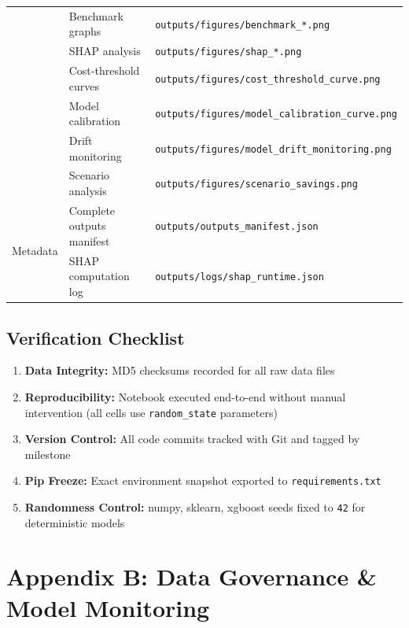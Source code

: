 \documentclass[12pt,a4paper]{article}
\begin{document}
\begin{table}[H]
\begin{tabular}{|l|p{8cm}|l|}
& Benchmark graphs & \texttt{outputs/figures/benchmark\_*.png} \\
& SHAP analysis & \texttt{outputs/figures/shap\_*.png} \\
& Cost-threshold curves & \texttt{outputs/figures/cost\_threshold\_curve.png} \\
& Model calibration & \texttt{outputs/figures/model\_calibration\_curve.png} \\
& Drift monitoring & \texttt{outputs/figures/model\_drift\_monitoring.png} \\
& Scenario analysis & \texttt{outputs/figures/scenario\_savings.png} \\
\hline
\multirow{2}{*}{Metadata} & Complete outputs manifest & \texttt{outputs/outputs\_manifest.json} \\
& SHAP computation log & \texttt{outputs/logs/shap\_runtime.json} \\
\hline
\end{tabular}
\end{table}

\subsection*{Verification Checklist}

\begin{enumerate}
    \item \textbf{Data Integrity:} MD5 checksums recorded for all raw data files
    \item \textbf{Reproducibility:} Notebook executed end-to-end without manual intervention (all cells use \texttt{random\_state} parameters)
    \item \textbf{Version Control:} All code commits tracked with Git and tagged by milestone
    \item \textbf{Pip Freeze:} Exact environment snapshot exported to \texttt{requirements.txt}
    \item \textbf{Randomness Control:} numpy, sklearn, xgboost seeds fixed to \texttt{42} for deterministic models
\end{enumerate}

\section*{Appendix B: Data Governance \& Model Monitoring}
\end{document}
